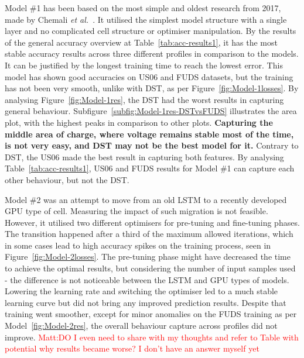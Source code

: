 %
%
Model \#1 has been based on the most simple and oldest research from 2017, made by Chemali \textit{et al.}~\cite{Chemali2017}.
It utilised the simplest model structure with a single layer and no complicated cell structure or optimiser manipulation.
By the results of the general accuracy overview at Table~\ref{tab:acc-results1}, it has the most stable accuracy results across three different profiles in comparison to the models.
It can be justified by the longest training time to reach the lowest error.
This model has shown good accuracies on US06 and FUDS datasets, but the training has not been very smooth, unlike with DST, as per Figure~\ref{fig:Model-1losses}.
By analysing Figure~\ref{fig:Model-1res}, the DST had the worst results in capturing general behaviour. Subfigure~\ref{subfig:Model-1res-DSTvsFUDS} illustrates the area plot, with the highest peaks in comparison to other plots.
\textbf{Capturing the middle area of charge, where voltage remains stable most of the time, is not very easy, and DST may not be the best model for it.}
Contrary to DST, the US06 made the best result in capturing both features.
By analysing Table~\ref{tab:acc-results1}, US06 and FUDS results for Model \#1 can capture each other behaviour, but not the DST.

%
%
Model \#2 was an attempt to move from an old LSTM to a recently developed GPU type of cell.
Measuring the impact of such migration is not feasible.
However, it utilised two different optimisers for pre-tuning and fine-tuning phases.
The transition happened after a third of the maximum allowed iterations, which in some cases lead to high accuracy spikes on the training process, seen in Figure~\ref{fig:Model-2losses}.
The pre-tuning phase might have decreased the time to achieve the optimal results, but considering the number of input samples used - the difference is not noticeable between the LSTM and GPU types of models.
Lowering the learning rate and switching the optimiser led to a much stable learning curve but did not bring any improved prediction results.
Despite that training went smoother, except for minor anomalies on the FUDS training as per Model~\ref{fig:Model-2res}, the overall behaviour capture across profiles did not improve.
\textcolor{red}{Matt:DO I even need to share with my thoughts and refer to Table with potential why results became worse? I don't have an answer myself yet}

